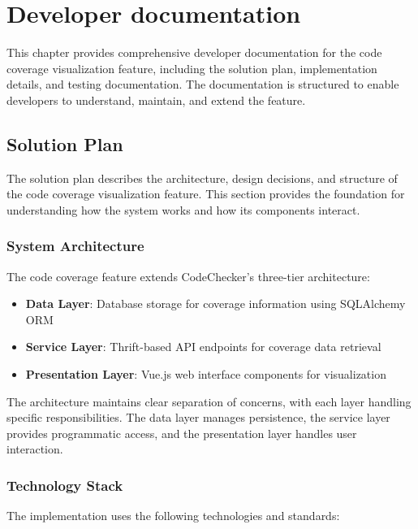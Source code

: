 \chapter{Developer documentation}
\label{ch:impl}

This chapter provides comprehensive developer documentation for the code coverage visualization feature, including the solution plan, implementation details, and testing documentation. The documentation is structured to enable developers to understand, maintain, and extend the feature.

\section{Solution Plan}

The solution plan describes the architecture, design decisions, and structure of the code coverage visualization feature. This section provides the foundation for understanding how the system works and how its components interact.

\subsection{System Architecture}

The code coverage feature extends CodeChecker's three-tier architecture:

\begin{itemize}
    \item \textbf{Data Layer}: Database storage for coverage information using SQLAlchemy ORM
    \item \textbf{Service Layer}: Thrift-based API endpoints for coverage data retrieval
    \item \textbf{Presentation Layer}: Vue.js web interface components for visualization
\end{itemize}

The architecture maintains clear separation of concerns, with each layer handling specific responsibilities. The data layer manages persistence, the service layer provides programmatic access, and the presentation layer handles user interaction.

\subsection{Technology Stack}

The implementation uses the following technologies and standards:

